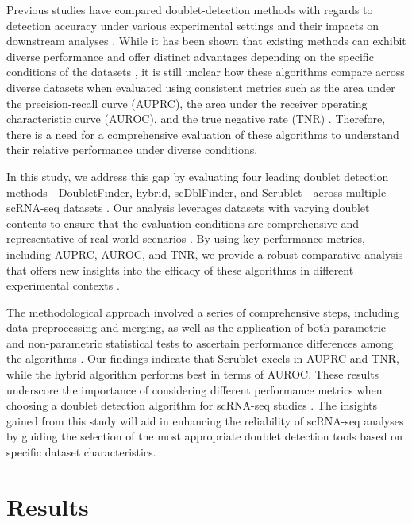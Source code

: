 \documentclass[11pt]{article}
\begin{document}
Previous studies have compared doublet-detection methods with regards to detection accuracy under various experimental settings and their impacts on downstream analyses \cite{Xi2020BenchmarkingCD,Shainer2021ChoiceOA}. While it has been shown that existing methods can exhibit diverse performance and offer distinct advantages depending on the specific conditions of the datasets \cite{McGinnis2018DoubletFinderDD,Xi2021ProtocolFE}, it is still unclear how these algorithms compare across diverse datasets when evaluated using consistent metrics such as the area under the precision-recall curve (AUPRC), the area under the receiver operating characteristic curve (AUROC), and the true negative rate (TNR) \cite{Germain2021DoubletII}. Therefore, there is a need for a comprehensive evaluation of these algorithms to understand their relative performance under diverse conditions.

In this study, we address this gap by evaluating four leading doublet detection methods—DoubletFinder, hybrid, scDblFinder, and Scrublet—across multiple scRNA-seq datasets \cite{Jain2023SinglecellRS,Freytag2018ComparisonOC}. Our analysis leverages datasets with varying doublet contents to ensure that the evaluation conditions are comprehensive and representative of real-world scenarios \cite{Reyfman2019SingleCellTA,Kleshchevnikov2020ComprehensiveMO}. By using key performance metrics, including AUPRC, AUROC, and TNR, we provide a robust comparative analysis that offers new insights into the efficacy of these algorithms in different experimental contexts \cite{Deng2020CharacteristicsOA}. 

The methodological approach involved a series of comprehensive steps, including data preprocessing and merging, as well as the application of both parametric and non-parametric statistical tests to ascertain performance differences among the algorithms \cite{Shi2020GraphPiHP,Germain2021DoubletII}. Our findings indicate that Scrublet excels in AUPRC and TNR, while the hybrid algorithm performs best in terms of AUROC. These results underscore the importance of considering different performance metrics when choosing a doublet detection algorithm for scRNA-seq studies \cite{Wolock2018ScrubletCI,Zhu2018IdentificationOS}. The insights gained from this study will aid in enhancing the reliability of scRNA-seq analyses by guiding the selection of the most appropriate doublet detection tools based on specific dataset characteristics.

\section*{Results}
\end{document}
